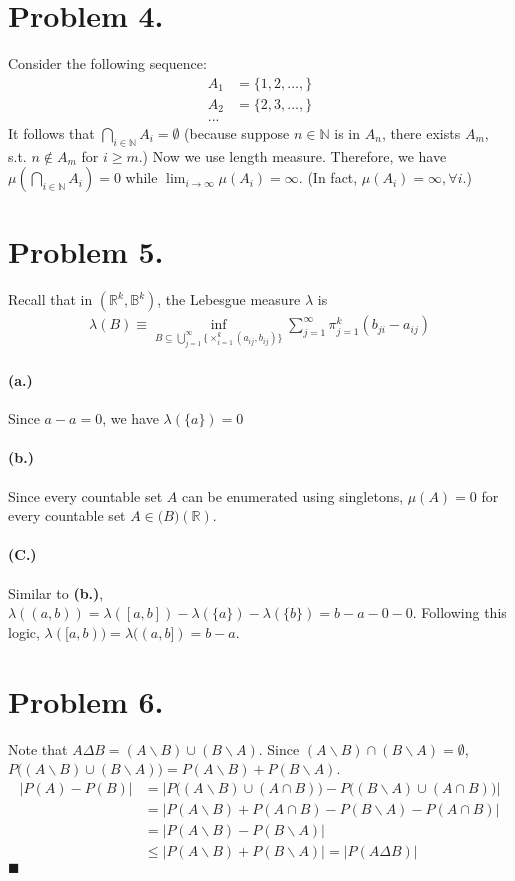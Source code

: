 \documentclass[11pt]{article}
\theoremstyle{definition}
\theoremstyle{boldtitle} %
\numberwithin{equation}{section}
\numberwithin{figure}{section}
\numberwithin{table}{section}
\begin{document}
\section*{Problem 4.}
Consider the following sequence:
\begin{align*}
  A_1 & = \{1, 2, \ldots,  \} \\
  A_2 & = \{2, 3, \ldots,  \} \\
  ...
\end{align*}
It follows that $\bigcap_{i \in \mathbb{N}} A_i = \emptyset$ (because suppose $n \in \mathbb{N}$ is in 
$A_n$, there exists $A_{m}$, s.t. $n \notin A_m$ for $i \geq m$.)
Now we use length measure.
Therefore, we have $\mu(\bigcap_{i \in \mathbb{N}} A_i) = 0$ while 
$\lim_{i \rightarrow \infty} \mu(A_i) = \infty$. (In fact, $\mu(A_i) = \infty, \forall i$.)

\section*{Problem 5.}
Recall that in $(\mathbb{R}^k, \mathbb{B}^k)$, the Lebesgue measure $\lambda$ is 
\begin{align*}
  \lambda(B) \equiv \inf_{B \subseteq \bigcup_{j=1}^\infty \{\times_{i=1}^k (a_{ij}, b_{ij}) \} } \sum_{j=1}^\infty \pi_{j=1}^k (b_{ji} - a_{ij})
\end{align*}
\paragraph{(a.)} Since $a-a = 0$, we have $\lambda(\{a\}) = 0$
\paragraph{(b.)} Since every countable set $A$ can be enumerated using singletons,
$\mu(A) = 0$ for every countable set $A \in \mathcal(B)(\mathbb{R})$. 
\paragraph{(C.)} Similar to \textbf{(b.)}, $\lambda((a, b)) = \lambda([a, b]) - \lambda(\{a\}) -\lambda(\{b\}) = b - a - 0 -0$.
Following this logic, $\lambda([a, b)) = \lambda((a, b])  = b -a$.


\section*{Problem 6.}
Note that $A \Delta B = (A \backslash B) \cup (B \backslash A)$. 
Since $(A \backslash B) \cap (B \backslash A) = \emptyset$, 
$P\bigg((A \backslash B) \cup (B \backslash A) \bigg) = P(A \backslash B) + P(B \backslash A)$.
\begin{align*}
  |P(A) - P(B)|& = |P\bigg((A\backslash B)  \cup (A \cap B) \bigg) - P\bigg((B\backslash A)  \cup (A \cap B) \bigg) | \\
  & = |P(A\backslash B) + P(A \cap B) - P(B\backslash A) - P(A \cap B)| \\
  & = |P(A\backslash B) - P(B\backslash A)| \\
  & \leq |P(A\backslash B) + P(B\backslash A)| = |P(A\Delta B)|
\end{align*}
\(\blacksquare\)

\end{document}
